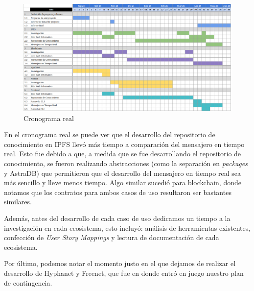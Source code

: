 \begin{figure}[H]
    \centering
    \includegraphics[width=1\linewidth]{img/cronograma-real.png}
    \caption{Cronograma real}
    \label{fig:cronograma-real}
\end{figure}

En el cronograma real se puede ver que el desarrollo del repositorio de conocimiento en IPFS llevó más tiempo a comparación del mensajero en tiempo real. Esto fue debido a que, a medida que se fue desarrollando el repositorio de conocimiento, se fueron realizando abstracciones (como la separación en \textit{packages} y AstraDB) que permitieron que el desarrollo del mensajero en tiempo real sea más sencillo y lleve menos tiempo. Algo similar sucedió para blockchain, donde notamos que los contratos para ambos casos de uso resultaron ser bastantes similares.

Además, antes del desarrollo de cada caso de uso dedicamos un tiempo a la investigación en cada ecosistema, esto incluyó: análisis de herramientas existentes, confección de \textit{User Story Mappings} y lectura de documentación de cada ecosistema.

Por último, podemos notar el momento justo en el que dejamos de realizar el desarrollo de Hyphanet y Freenet, que fue en donde entró en juego nuestro plan de contingencia. 